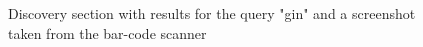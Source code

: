 \documentclass[paper=a4, fontsize=12pt]{scrartcl}
\numberwithin{equation}{section}		%
\numberwithin{figure}{section}			%
\numberwithin{table}{section}				%
\begin{document}
\begin{figure}[!ht]%
    \centering
    \qquad
    \caption{Discovery section with results for the query "gin" and a screenshot taken from the bar-code scanner}%
    \label{discovery section}%
\end{figure}
\end{document}
